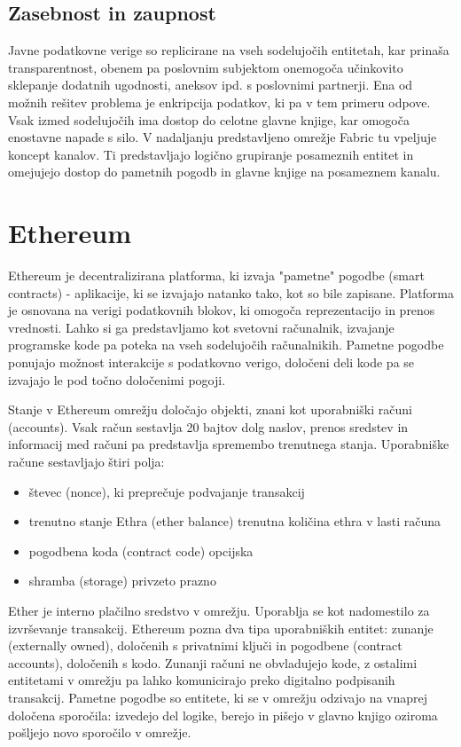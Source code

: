 \documentclass[a4paper, 12pt]{book}
\begin{document}
\subsection{Zasebnost in zaupnost}
Javne podatkovne verige so replicirane na vseh sodelujočih entitetah, kar prinaša transparentnost, obenem pa poslovnim subjektom onemogoča učinkovito sklepanje dodatnih ugodnosti, aneksov ipd. s poslovnimi partnerji.
Ena od možnih rešitev problema je enkripcija podatkov, ki pa v tem primeru odpove.
Vsak izmed sodelujočih ima dostop do celotne glavne knjige, kar omogoča enostavne napade s silo.
V nadaljanju predstavljeno omrežje Fabric tu vpeljuje koncept kanalov.
Ti predstavljajo logično grupiranje posameznih entitet in omejujejo dostop do pametnih pogodb in glavne knjige na posameznem kanalu. \cite{hyperledgerDocs}

\section{Ethereum}
Ethereum je decentralizirana platforma, ki izvaja "pametne" pogodbe (smart contracts) - aplikacije, ki se izvajajo natanko tako, kot so bile zapisane.
Platforma je osnovana na verigi podatkovnih blokov, ki omogoča reprezentacijo in prenos vrednosti.
Lahko si ga predstavljamo kot svetovni računalnik, izvajanje programske kode pa poteka na vseh sodelujočih računalnikih.
Pametne pogodbe ponujajo možnost interakcije s podatkovno verigo, določeni deli kode pa se izvajajo le pod točno določenimi pogoji.

Stanje v Ethereum omrežju določajo objekti, znani kot uporabniški računi (accounts).
Vsak račun sestavlja 20 bajtov dolg naslov, prenos sredstev in informacij med računi pa predstavlja spremembo trenutnega stanja.
Uporabniške račune sestavljajo štiri polja:
\begin{itemize}
\item števec (nonce), ki preprečuje podvajanje transakcij
\item trenutno stanje Ethra (ether balance) trenutna količina ethra v lasti računa
\item pogodbena koda (contract code) opcijska
\item shramba (storage) privzeto prazno
\end{itemize}

Ether je interno plačilno sredstvo v omrežju.
Uporablja se kot nadomestilo za izvrševanje transakcij.
Ethereum pozna dva tipa uporabniških entitet: zunanje (externally owned), določenih s privatnimi ključi in pogodbene (contract accounts), določenih s kodo.
Zunanji računi ne obvladujejo kode, z ostalimi entitetami v omrežju pa lahko komunicirajo preko digitalno podpisanih transakcij.
Pametne pogodbe so entitete, ki se v omrežju odzivajo na vnaprej določena sporočila: izvedejo del logike, berejo in pišejo v glavno knjigo oziroma pošljejo novo sporočilo v omrežje.
\end{document}
